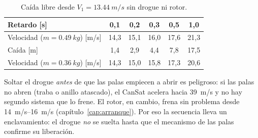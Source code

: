 \begin{table}[H]
\centering\small
\caption{Caída libre desde $V_1=\SI{13.44}{m/s}$ sin drogue ni rotor.}\label{tab:arq-libre}
\begin{tabular}{@{}lccccc@{}}
\toprule
Retardo [s] & 0,1 & 0,2 & 0,3 & 0,5 & 1,0\\\midrule
Velocidad ($m=\SI{0.49}{kg}$) [m/s] & 14,3 & 15,1 & 16,0 & 17,6 & 21,3\\
Caída [m] & 1,4 & 2,9 & 4,4 & 7,8 & 17,5\\
Velocidad ($m=\SI{0.36}{kg}$) [m/s] & 14,3 & 15,0 & 15,8 & 17,3 & 20,6\\
\bottomrule
\end{tabular}
\end{table}

Soltar el drogue \emph{antes} de que las palas empiecen a abrir es peligroso: si las palas
no abren (traba o anillo atascado), el CanSat acelera hacia \SI{39}{m/s} y no hay segundo
sistema que lo frene. El rotor, en cambio, frena sin problema desde \SIrange{14}{16}{m/s}
(capítulo~\ref{cap:arranque}). Por eso la secuencia lleva un enclavamiento: el drogue
\emph{no} se suelta hasta que el mecanismo de las palas confirme su liberación.

